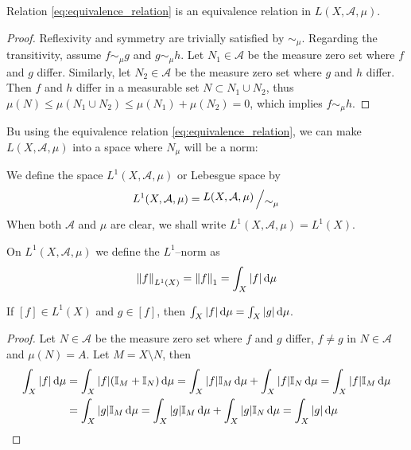 \begin{prop}
	Relation \eqref{eq:equivalence_relation} is an equivalence relation in $L(X, \mathcal{A}, \mu)$. 
\end{prop}
\begin{proof}
	Reflexivity and symmetry are trivially satisfied by $\sim_\mu$. Regarding
	the transitivity, assume $f \sim_\mu g$ and $g \sim_\mu h$. Let $N_1 \in
	\mathcal{A}$ be the measure zero set where $f$ and $g$ differ. Similarly, let $N_2
	\in \mathcal{A}$ be the measure zero set where $g$ and $h$ differ. Then $f$ and $h$
	differ in a measurable set $N \subset N_1 \cup N_2$, thus $\mu(N) \leq
	\mu(N_1 \cup N_2) \leq \mu(N_1) + \mu(N_2) = 0$, which implies $f \sim_\mu h$.
\end{proof}

Bu using the equivalence relation \eqref{eq:equivalence_relation}, we can make
$L(X, \mathcal{A}, \mu)$ into a space where $N_\mu$ will be a norm:

\begin{definition*}
	We define the space $L^1(X, \mathcal{A}, \mu)$ or Lebesgue space by
	\[
		L^1(X, \mathcal{A}, \mu) = \quotient{L(X, \mathcal{A}, \mu)}{\sim_\mu}
	\]
	When both $\mathcal{A}$ and $\mu$ are clear, we shall write $L^1(X, \mathcal{A}, \mu) = L^1(X)$.
\end{definition*}

\begin{definition*}
	On $L^1(X, \mathcal{A}, \mu)$ we define the $L^1$--norm as
	\[
		\norm{f}_{L^1(X)} = \norm{f}_1 = \int_X \abs{f} \dd{\mu}
	\]
\end{definition*}


\begin{prop} \label{eq:integral_does_not_depend_on_representative}
	If $[f] \in L^1(X)$ and $g \in [f]$, then $\int_X \abs{f} \dd{\mu} = \int_X
	\abs{g} \dd{\mu}$.
\end{prop}
\begin{proof}
	Let $N \in \mathcal{A}$ be the measure zero set where $f$ and $g$ differ, \ie $f
	\neq g$ in $N \in \mathcal{A}$ and $\mu(N) = A$. Let $M = X \setminus N$,
	then
	\begin{align*}
		\int_X \abs{f} \dd{\mu} &= 
		\int_X \abs{f} (\mathbb{I}_M + \mathbb{I}_N) \dd{\mu} = 
		\int_X \abs{f} \mathbb{I}_M \dd{\mu} + \int_X \abs{f} \mathbb{I}_N \dd{\mu} = 
		\int_X \abs{f} \mathbb{I}_M \dd{\mu} \\ &=
		\int_X \abs{g} \mathbb{I}_M \dd{\mu} = 
		\int_X \abs{g} \mathbb{I}_M \dd{\mu} + \int_X \abs{g} \mathbb{I}_N \dd{\mu} = 
		\int_X \abs{g} \dd{\mu}
	\end{align*}
\end{proof}

